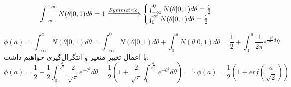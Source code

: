 
$$
\int_{-\infty}^{+\infty} N(\theta | 0, 1) d\theta = 1 \xRightarrow{Symmetric} 
\begin{cases}
\int_{-\infty}^{0}N(\theta | 0, 1)d\theta = \frac{1}{2} \\
\int_{0}^{\infty}N(\theta | 0, 1)d\theta = \frac{1}{2}
\end{cases}
$$

$$
\phi(a)  = \int_{-\infty}^{a} N(\theta | 0, 1) d\theta = \int_{-\infty}^{0} N(\theta | 0, 1) d\theta + \int_{0}^{a} N(\theta | 0, 1) d\theta =
 \frac{1}{2} + \int_{0}^{a} \frac{1}{2\pi} e^{\frac{-\theta^2}{2}d}\theta
$$
با اعمال تغییر متغیر و انتگرال‌گیری خواهیم داشت:
$$
\phi(a) = \frac{1}{2} + \frac{1}{2} \int_{0}^{\frac{a}{\sqrt{2}}} \frac{2}{\sqrt{\pi}}e^{-\theta^2}d\theta
= \frac{1}{2}(1 + \frac{2}{\sqrt{\pi}}\int_{0}^{\frac{a}{\sqrt{2}}}e^{-\theta^2}d\theta) \implies \phi(a) = \frac{1}{2}(1 + erf(\frac{a}{\sqrt{2}}))
$$